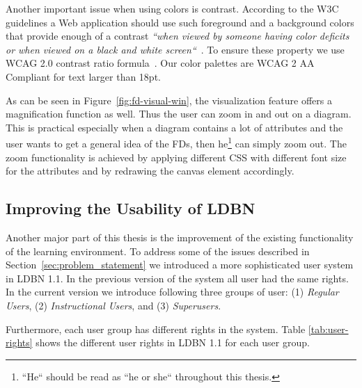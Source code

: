 
Another important issue when using colors is contrast. 
According to the W3C guidelines a Web application should use such
foreground and a background colors that provide enough of a
contrast \emph{``when viewed by someone having color deficits or when 
viewed on a black and white screen``}~\cite{w3c1}.
To ensure these property we use WCAG 2.0 contrast ratio formula~\cite{w3c2}.
Our color palettes are WCAG 2 AA Compliant for text larger than 18pt.

As can be seen in Figure~\ref{fig:fd-visual-win}, 
the visualization feature offers a magnification function as well. 
Thus the user can zoom in and out on a diagram.
This is practical especially when a
diagram contains a lot of attributes and the user 
wants to get a general idea of the FDs, then 
he\footnote{``He`` should be read as ``he or she`` throughout this thesis.} can
simply zoom out. 
The zoom functionality
is achieved by applying different CSS with different font 
size for the attributes and by redrawing the canvas element accordingly. 

\subsection{Improving the Usability of LDBN}
\label{sec:improving}

Another major part of this thesis is the improvement of the
existing functionality of the learning environment. 
To address some of the issues described in 
Section~\ref{sec:problem_statement} we introduced a more sophisticated user system in 
LDBN 1.1. In the previous version of the system all user had the same rights. 
In the current version we introduce following three groups of user:
(1) \emph{Regular Users}, (2) \emph{Instructional Users}, and (3) \emph{Superusers}.

Furthermore, each user group has different rights in the system. 
Table \ref{tab:user-rights} shows the different user rights in LDBN 1.1 for each user group. 

